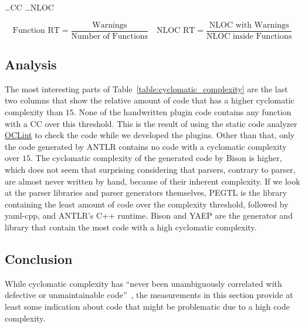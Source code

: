 \begin{table}[H]
\begin{adjustbox}{max width=\textwidth}
\begin{threeparttable}
  \vspace{0.2cm}
  \begin{tablenotes}
    \item
        \hspace{1.65cm}
        …\glsdesc{CC}
        \hspace{1.7cm}
        …\glsdesc{NLOC}
    \item
      \[
       \text{Function RT} = \frac{\text{Warnings}}{\text{Number of Functions}}\quad
       \text{NLOC RT} = \frac{\text{NLOC with Warnings}}{\text{NLOC inside Functions}}
      \]
  \end{tablenotes}

  \end{threeparttable}
  \end{adjustbox}
\end{table}

\subsection{Analysis}

The most interesting parts of Table~\ref{table:cyclomatic_complexity} are the last two columns that show the relative amount of code that has a higher cyclomatic complexity than $15$. None of the handwritten plugin code contains any function with a \gls{CC} over this threshold. This is the result of using the static code analyzer \href{http://oclint.org}{OCLint} to check the code while we developed the plugins. Other than that, only the code generated by \gls{ANTLR} contains no code with a cyclomatic complexity over $15$. The cyclomatic complexity of the generated code by Bison is higher, which does not seem that surprising considering that  parsers, contrary to  parser, are almost never written by hand, because of their inherent complexity. If we look at the parser libraries and parser generators themselves, \gls{PEGTL} is the library containing the least amount of code over the complexity threshold, followed by yaml-cpp, and ANTLR’s C++ runtime. Bison and \gls{YAEP} are the generator and library that contain the most code with a high cyclomatic complexity.

\subsection{Conclusion}

While cyclomatic complexity has “never been unambiguously correlated with defective or unmaintainable code”~\cite{martin2017c++}, the measurements in this section provide at least some indication about code that might be problematic due to a high code complexity.

